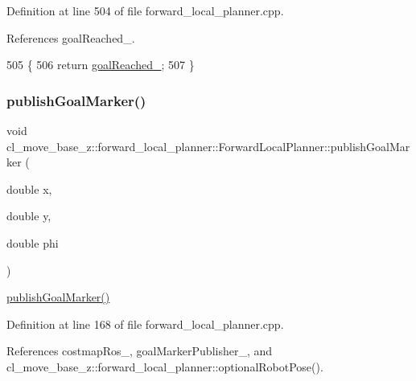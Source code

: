 Definition at line 504 of file forward\+\_\+local\+\_\+planner.\+cpp.



References goal\+Reached\+\_\+.


\begin{DoxyCode}
505 \{
506     \textcolor{keywordflow}{return} \hyperlink{classcl__move__base__z_1_1forward__local__planner_1_1ForwardLocalPlanner_a9d51ad6f0eb364ebd830526280bdf4fc}{goalReached\_};
507 \}
\end{DoxyCode}
\mbox{\label{classcl__move__base__z_1_1forward__local__planner_1_1ForwardLocalPlanner_ae2ef5a1d00495eb7a6c22ec35ab8baf2}} 
\subsubsection{\texorpdfstring{publish\+Goal\+Marker()}{publishGoalMarker()}}
{\footnotesize\ttfamily void cl\+\_\+move\+\_\+base\+\_\+z\+::forward\+\_\+local\+\_\+planner\+::\+Forward\+Local\+Planner\+::publish\+Goal\+Marker (\begin{DoxyParamCaption}\item[{double}]{x,  }\item[{double}]{y,  }\item[{double}]{phi }\end{DoxyParamCaption})\hspace{0.3cm}{\ttfamily [private]}}

\hyperlink{classcl__move__base__z_1_1forward__local__planner_1_1ForwardLocalPlanner_ae2ef5a1d00495eb7a6c22ec35ab8baf2}{publish\+Goal\+Marker()} 

Definition at line 168 of file forward\+\_\+local\+\_\+planner.\+cpp.



References costmap\+Ros\+\_\+, goal\+Marker\+Publisher\+\_\+, and cl\+\_\+move\+\_\+base\+\_\+z\+::forward\+\_\+local\+\_\+planner\+::optional\+Robot\+Pose().



